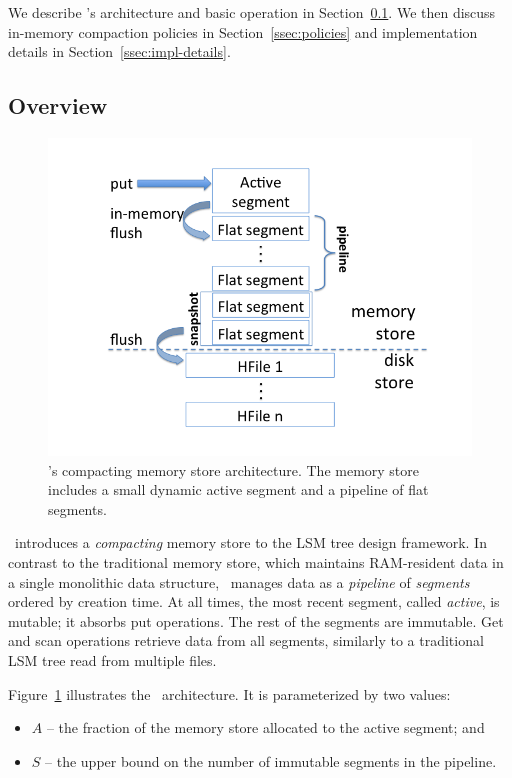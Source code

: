 
We describe  \sys's architecture and basic operation in Section~\ref{ssec:overview}.
We then discuss in-memory compaction policies  in  Section~\ref{ssec:policies}
and implementation details in Section~\ref{ssec:impl-details}. 

\subsection{Overview} \label{ssec:overview}

\begin{figure}[tbh]
\center
\includegraphics[width=\columnwidth, trim={0 1cm 0 1cm}, clip]{Accordion} 
\caption{\sys's compacting memory store architecture. The memory store includes a small dynamic active segment 
and a pipeline of flat segments. }
\label{fig:accordion}
\end{figure}

\sys\ introduces a \emph{compacting} memory store to the LSM tree design framework. In contrast to the traditional memory store, 
which maintains RAM-resident data in a single monolithic data structure, \sys\ manages data as a \emph{pipeline} of 
\emph{segments} ordered by creation time. At all times, the most recent segment, called \emph{active}, is mutable;
it absorbs  put operations. The rest of the segments are immutable. Get and scan operations retrieve data from all  segments, 
 similarly to a traditional LSM tree read from multiple files. 
 
 Figure~\ref{fig:accordion} illustrates the \sys\ architecture. It is parameterized by two values:
\begin{itemize}
\item  $A$ -- the fraction of the memory store allocated to the active segment; and 
\item $S$ -- the upper bound on the number of immutable segments in the pipeline. 
\end{itemize}

